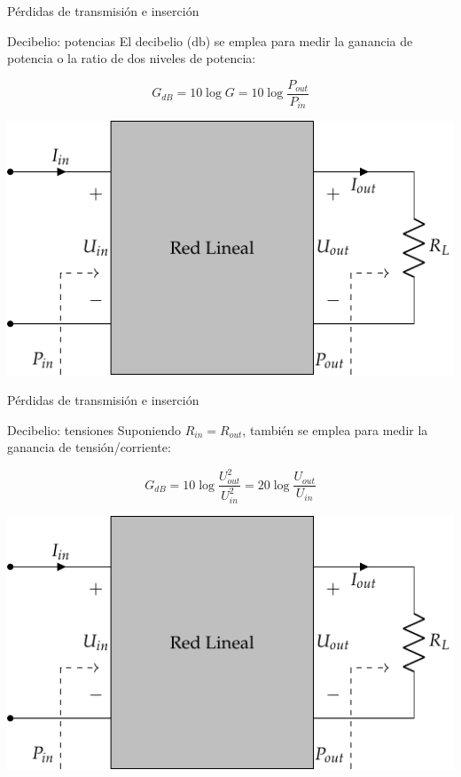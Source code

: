 \documentclass[aspectratio=169, usenames,svgnames,dvipsnames]{beamer}
\begin{document}
\begin{frame}[label={sec:orgb2d7722}]{Pérdidas de transmisión e inserción}
\begin{block}{Decibelio: potencias}
El \alert{decibelio} (\(\si{\decibel}\)) se emplea para medir la ganancia de potencia o la ratio de dos niveles de potencia:

\[
G_{dB} = 10 \log G = 10 \log \frac{P_{out}}{P_{in}}
\]
\begin{center}
\includegraphics[height=0.5\textheight]{../figs/cuadripolo_cargado_resistencia.pdf}
\end{center}
\end{block}
\end{frame}

\begin{frame}[label={sec:org3f47429}]{Pérdidas de transmisión e inserción}
\begin{block}{Decibelio: tensiones}
Suponiendo \(R_{in} = R_{out}\), también se emplea para medir la ganancia de tensión/corriente:

\[
G_{dB} = 10 \log \frac{U_{out}^2}{U_{in}^2} = 20 \log \frac{U_{out}}{U_{in}}
\]
\begin{center}
\includegraphics[height=0.5\textheight]{../figs/cuadripolo_cargado_resistencia.pdf}
\end{center}
\end{block}
\end{frame}
\end{document}
